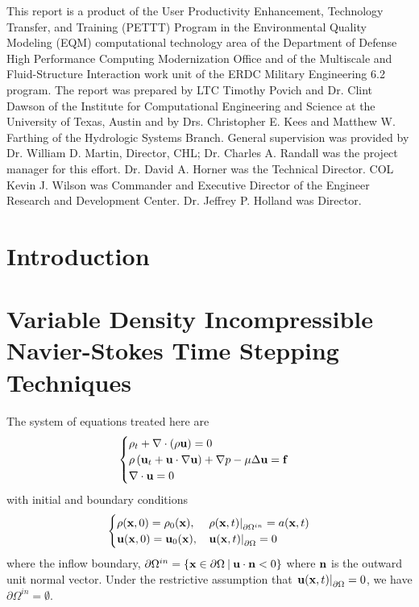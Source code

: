 \documentclass[letterpaper]{erdc}
\begin{document}
This report is a product of the User Productivity Enhancement,
Technology Transfer, and Training (PETTT) Program in the Environmental
Quality Modeling (EQM) computational technology area of the Department
of Defense High Performance Computing Modernization Office and of the
Multiscale and Fluid-Structure Interaction work unit of the ERDC
Military Engineering 6.2 program. The report was prepared by LTC
Timothy Povich and Dr. Clint Dawson of the Institute for Computational
Engineering and Science at the University of Texas, Austin and by
Drs. Christopher E. Kees and Matthew W. Farthing of the Hydrologic
Systems Branch.  General supervision was provided by Dr. William
D. Martin, Director, CHL; Dr. Charles A. Randall was the project
manager for this eﬀort. Dr. David A. Horner was the Technical
Director. COL Kevin J. Wilson was Commander and Executive Director of
the Engineer Research and Development Center. Dr. Jeffrey P. Holland
was Director.

\mainmatter

\chapter{Introduction}


%
%
%
%
\chapter{Variable Density Incompressible Navier-Stokes Time Stepping Techniques}

The system of equations treated here are
\begin{equation}\label{eqn:variabledensityNavierStokes}
  \begin{cases}
    \rho_t + \nabla\cdot\left( \rho \textbf{u}\right) = 0 &\\
    \rho\left(\textbf{u}_t + \textbf{u}\cdot\nabla\textbf{u}  \right) + \nabla p - \mu\Delta \textbf{u} = \textbf{f} &\\
    \nabla\cdot \textbf{u} = 0
  \end{cases}
\end{equation}
with initial and boundary conditions
\begin{equation}\label{eqn:variabledensityNavierStokesBCIC}
  \begin{cases}
    \rho(\textbf{x},0) = \rho_0(\textbf{x}), & \left.\rho(\textbf{x},t)\right|_{\partial\Omega^{in}} = a(\textbf{x},t)\\
    \textbf{u}(\textbf{x},0) = \textbf{u}_0(\textbf{x}), & \left.\textbf{u}(\textbf{x},t)\right|_{\partial\Omega} = 0
  \end{cases}
\end{equation}
where the inflow boundary, $\partial\Omega^{in} = \{ \textbf{x}\in \partial\Omega \:|\: \textbf{u}\cdot\textbf{n} <0 \}$ where $\textbf{n}$ is the outward unit normal vector.  Under the restrictive assumption that $\left.\textbf{u}(\textbf{x},t)\right|_{\partial\Omega} = 0$, we have $\partial\Omega^{in}= \emptyset$.
\end{document}
